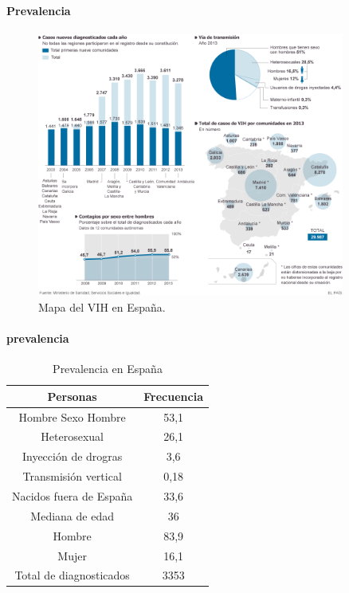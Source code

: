 \documentclass[a4paper,twocolumn,10pt]{article}
\begin{document}
\paragraph{Prevalencia}
\begin{figure}[htb]
\centering
\includegraphics[width=0.9\textwidth]{./sida}
\caption{Mapa del VIH en España. \cite{Benito2014}}
\label{fig:VIH}
\end{figure}
\paragraph{prevalencia}
\begin{table}[htbp]
\begin{center}
\begin{tabular}{|c|c|}
\hline 
{\cellcolor[gray]{0.7} \bfseries Personas} & {\cellcolor[gray]{0.7} \bfseries Frecuencia} \\ \hline 
Hombre Sexo Hombre & 53,1 \\ \hline
Heterosexual & 26,1 \\ \hline
Inyección de drogras & 3,6 \\ \hline
Transmisión vertical & 0,18 \\ \hline
Nacidos fuera de España & 33,6 \\ \hline
Mediana de edad & 36 \\ \hline
Hombre & 83,9 \\ \hline
Mujer & 16,1 \\ \hline 
Total de diagnosticados & 3353 \\ \hline 
\end{tabular}
\caption{Prevalencia en España \cite{Molina2018}}
\label{tabla:Prevalencia}
\end{center}
\end{table}
\end{document}
